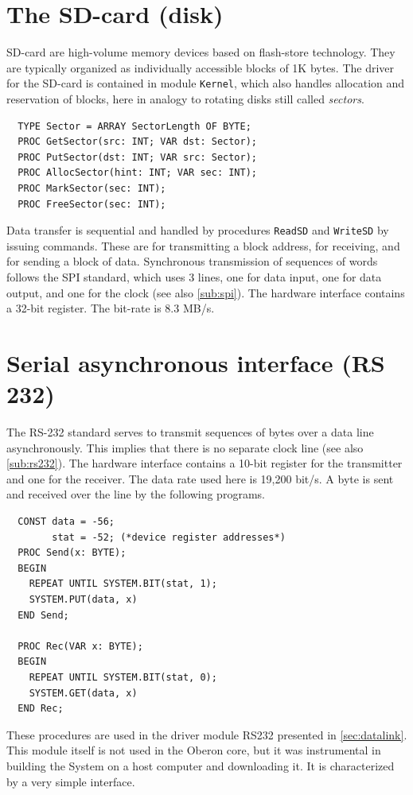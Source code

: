 \section{The SD-card (disk)}
SD-card are high-volume memory devices based on flash-store technology. They are typically
organized as individually accessible blocks of 1K bytes. The driver for the SD-card is
contained in module \verb|Kernel|, which also handles allocation and reservation of blocks,
here in analogy to rotating disks still called \emph{sectors}.
\begin{verbatim}
  TYPE Sector = ARRAY SectorLength OF BYTE;
  PROC GetSector(src: INT; VAR dst: Sector);
  PROC PutSector(dst: INT; VAR src: Sector);
  PROC AllocSector(hint: INT; VAR sec: INT);
  PROC MarkSector(sec: INT);
  PROC FreeSector(sec: INT);
\end{verbatim}
Data transfer is sequential and handled by procedures \verb|ReadSD| and \verb|WriteSD| by
issuing commands. These are for transmitting a block address, for receiving, and for sending
a block of data. Synchronous transmission of sequences of words follows the SPI standard,
which uses 3 lines, one for data input, one for data output, and one for the clock (see also
\ref{sub:spi}). The hardware interface contains a 32-bit register. The bit-rate is 8.3 MB/s.

\section{Serial asynchronous interface (RS 232)}
The RS-232 standard serves to transmit sequences of bytes over a data line asynchronously.
This implies that there is no separate clock line (see also \ref{sub:rs232}). The hardware
interface contains a 10-bit register for the transmitter and one for the receiver. The data rate
used here is 19,200 bit/s. A byte is sent and received over the line by the following programs.
\begin{verbatim}
  CONST data = -56;
        stat = -52; (*device register addresses*)
  PROC Send(x: BYTE);
  BEGIN
    REPEAT UNTIL SYSTEM.BIT(stat, 1);
    SYSTEM.PUT(data, x)
  END Send;

  PROC Rec(VAR x: BYTE);
  BEGIN
    REPEAT UNTIL SYSTEM.BIT(stat, 0);
    SYSTEM.GET(data, x)
  END Rec;
\end{verbatim}
These procedures are used in the driver module RS232 presented in \ref{sec:datalink}. This
module itself is not used in the Oberon core, but it was instrumental in building the System
on a host computer and downloading it. It is characterized by a very simple interface.

